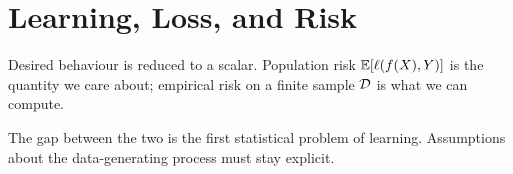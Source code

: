 \chapter{Learning, Loss, and Risk}
\label{ch:learning-and-risk}

Desired behaviour is reduced to a scalar. Population risk $\mathbb{E}[\ell(f(X),Y)]$ is the quantity we care about; empirical risk on a finite sample $\mathcal{D}$ is what we can compute.

The gap between the two is the first statistical problem of learning. Assumptions about the data-generating process must stay explicit.

